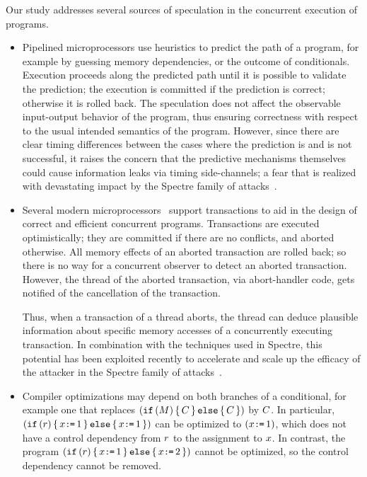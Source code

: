 Our study addresses several sources of speculation in the concurrent
execution of programs.
\begin{itemize}

\item Pipelined microprocessors use heuristics to predict the path of a
  program, for example by guessing memory dependencies, or the outcome of
  conditionals. Execution proceeds along the predicted path until it
  is possible to validate the prediction; the execution is committed
  if the prediction is correct; otherwise it is rolled
  back.  The speculation does not affect the observable input-output
  behavior of the program, thus ensuring correctness with respect to
  the usual intended semantics of the program. However, since there are
  clear timing differences between the cases where the prediction is
  and is not successful, it raises the concern that the predictive
  mechanisms themselves could cause information leaks via timing
  side-channels; a fear that is realized with devastating impact by
  the Spectre family of attacks~\cite{DBLP:journals/corr/abs-1801-01203}.

\item Several modern microprocessors~\cite{ChongSW18} support transactions
  to aid in the design of correct and efficient concurrent
  programs. Transactions are executed optimistically; they are
  committed if there are no conflicts, and aborted otherwise. All
  memory effects of an aborted transaction are rolled back; so there
  is no way for a concurrent observer to detect an aborted
  transaction.  However, the thread of the aborted transaction, via
  abort-handler code, gets notified of the cancellation of the
  transaction.

  Thus, when a transaction of a thread aborts, the thread can deduce
  plausible information about specific memory accesses of a
  concurrently executing transaction. In combination with the
  techniques used in Spectre, this potential has been exploited
  recently to accelerate and scale up the efficacy of the attacker in
  the Spectre family of attacks~\cite{DBLP:conf/uss/DisselkoenKPT17}.

\item Compiler optimizations may depend on both branches of
  a conditional, for example one that replaces
  $(\texttt{if}\,(M)\,\{\, C \,\}\,\texttt{else}\,\{\, C \,\})$ by $C$.
  In particular, $(\texttt{if}\,(r)\,\{\, x\texttt{:}\mkern-1mu\texttt{=}\,1 \,\}\,\texttt{else}\,\{\, x\texttt{:}\mkern-1mu\texttt{=}\,1 \,\})$
  can be optimized to $(x\texttt{:}\mkern-1mu\texttt{=}\,1)$, which does not have a control
  dependency from $r$ to the assignment to $x$.
  In contrast, the program $(\texttt{if}\,(r)\,\{\, x\texttt{:}\mkern-1mu\texttt{=}\,1 \,\}\,\texttt{else}\,\{\, x\texttt{:}\mkern-1mu\texttt{=}\,2 \,\})$
  cannot be optimized, so the control dependency cannot be removed.


\end{itemize}
